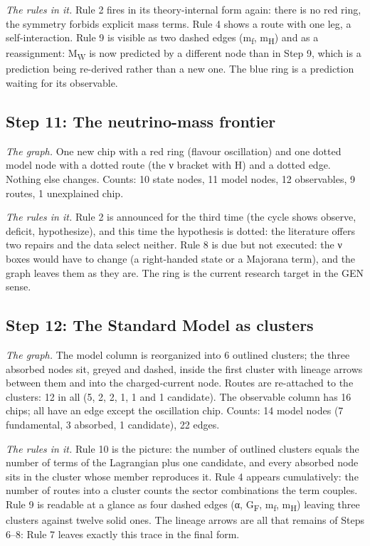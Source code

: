 \noindent\emph{The rules in it.} Rule 2 fires in its theory-internal form again: there is no red ring, the symmetry forbids explicit mass terms. Rule 4 shows a route with one leg, a self-interaction. Rule 9 is visible as two dashed edges (m\textsubscript{f}, m\textsubscript{H}) and as a reassignment: M\textsubscript{W} is now predicted by a different node than in Step 9, which is a prediction being re-derived rather than a new one. The blue ring is a prediction waiting for its observable.

\subsection*{Step 11: The neutrino-mass frontier}
\noindent\emph{The graph.} One new chip with a red ring (flavour oscillation) and one dotted model node with a dotted route (the ν bracket with H) and a dotted edge. Nothing else changes. Counts: 10 state nodes, 11 model nodes, 12 observables, 9 routes, 1 unexplained chip.

\noindent\emph{The rules in it.} Rule 2 is announced for the third time (the cycle shows observe, deficit, hypothesize), and this time the hypothesis is dotted: the literature offers two repairs and the data select neither. Rule 8 is due but not executed: the ν boxes would have to change (a right-handed state or a Majorana term), and the graph leaves them as they are. The ring is the current research target in the GEN sense.

\subsection*{Step 12: The Standard Model as clusters}
\noindent\emph{The graph.} The model column is reorganized into 6 outlined clusters; the three absorbed nodes sit, greyed and dashed, inside the first cluster with lineage arrows between them and into the charged-current node. Routes are re-attached to the clusters: 12 in all (5, 2, 2, 1, 1 and 1 candidate). The observable column has 16 chips; all have an edge except the oscillation chip. Counts: 14 model nodes (7 fundamental, 3 absorbed, 1 candidate), 22 edges.

\noindent\emph{The rules in it.} Rule 10 is the picture: the number of outlined clusters equals the number of terms of the Lagrangian plus one candidate, and every absorbed node sits in the cluster whose member reproduces it. Rule 4 appears cumulatively: the number of routes into a cluster counts the sector combinations the term couples. Rule 9 is readable at a glance as four dashed edges (α, G\textsubscript{F}, m\textsubscript{f}, m\textsubscript{H}) leaving three clusters against twelve solid ones. The lineage arrows are all that remains of Steps 6–8: Rule 7 leaves exactly this trace in the final form.

